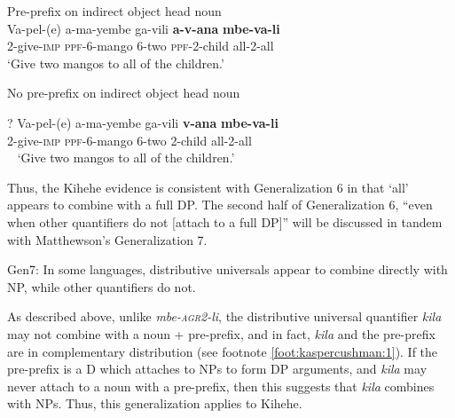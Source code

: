\documentclass[output=paper,modfonts,nonflat]{langsci/langscibook}
\begin{document}
\begin{exe} 

\ex  \label{ex:kaspercushman:mango} \begin{xlist}

\ex Pre-prefix on indirect object head noun \\

\gll Va-pel-(e) a-ma-yembe ga-vili \textbf{a-v-ana} \textbf{mbe-va-li} \\
2-give-\textsc{imp} \textsc{ppf}-6-mango 6-two \textsc{ppf}-2-child all-2-all\\ 
\vspace{-1.25ex}
\glt `Give two mangos to all of the children.' \\ \label{yesppfio} 



\ex No pre-prefix on indirect object head noun \

\gll ? Va-pel-(e) a-ma-yembe ga-vili \textbf{v-ana} \textbf{mbe-va-li} \\
{} 2-give-\textsc{imp} \textsc{ppf}-6-mango 6-two 2-child all-2-all\\ \label{ex:kaspercushman:noppfio}\
\vspace{-1.25ex}
\glt `Give two mangos to all of the children.'

\end{xlist}
\end{exe}

Thus, the Kihehe evidence is consistent with Generalization 6 in that `all' appears to combine with a full DP.  The second half of Generalization 6, ``even when other quantifiers do not [attach to a full DP]'' will be discussed in tandem with Matthewson's Generalization 7. 


\begin{exe}

\ex Gen7: In some languages, distributive universals appear to combine directly with NP, while other quantifiers do not. \cite[p. 36]{matthewson13} \\
\end{exe}

As described above, unlike \textit{mbe-\textsc{agr2}-li}, the distributive universal quantifier \textit{kila} may not combine with a noun + pre-prefix, and in fact, \textit{kila} and the pre-prefix are in complementary distribution (see footnote \ref{foot:kaspercushman:1}). If the pre-prefix is a D which attaches to NPs to form DP arguments, and \textit{kila} may never attach to a noun with a pre-prefix, then this suggests that \textit{kila} combines with NPs. Thus, this generalization applies to Kihehe. 
\end{document}
